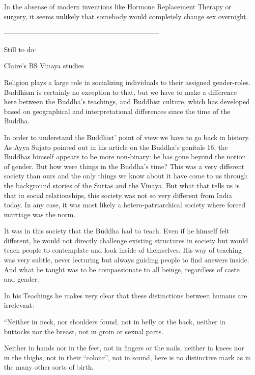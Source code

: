 In the absense of modern inventions like Hormone Replacement Therapy or surgery, it seems unlikely that somebody would completely change sex overnight. 




--------------------------------------------------------------------


Still to do:


Claire's
BS Vinaya studies







Religion plays a large role in socializing individuals to their assigned gender-roles. Buddhism is certainly no exception to that, but we have to make a difference here between the Buddha’s teachings, and Buddhist culture, which has developed based on geographical and interpretational differences since the time of the Buddha.

In order to understand the Buddhist’ point of view we have to go back in history. As Ayya Sujato pointed out in his article on the Buddha’s genitals 16, the Buddhas himself appears to be more non-binary: he has gone beyond the notion of gender. But how were things in the Buddha’s time? This was a very different society than ours and the only things we know about it have come to us through the background stories of the Suttas and the Vinaya. But what that tells us is that in social relationships, this society was not so very different from India today. In any case, it was most likely a hetero-patriarchical society where forced marriage was the norm.

It was in this society that the Buddha had to teach. Even if he himself felt different, he would not directly challenge existing structures in society but would teach people to contemplate and look inside of themselves. His way of teaching was very subtle, never lecturing but always guiding people to find answers inside. And what he taught was to be compassionate to all beings, regardless of caste and gender.

In his Teachings he makes very clear that these distinctions between humans are irrelevant:

“Neither in neck, nor shoulders found,
not in belly or the back,
neither in buttocks nor the breast,
not in groin or sexual parts.

Neither in hands nor in the feet,
not in fingers or the nails,
neither in knees nor in the thighs,
not in their “colour”, not in sound,
here is no distinctive mark
as in the many other sorts of birth.

